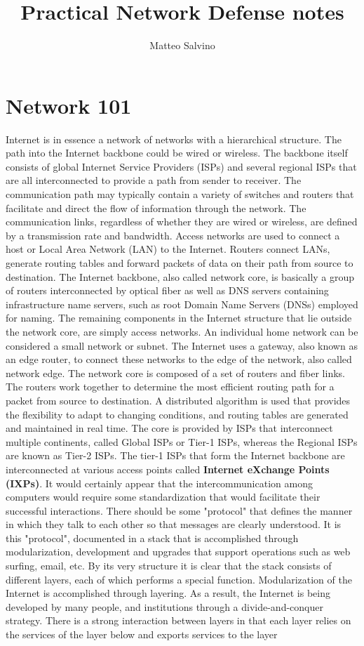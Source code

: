 \documentclass[11pt]{article}
\title{Practical Network Defense notes}
\author{Matteo Salvino}
\date{}
\begin{document}
\maketitle
\pagebreak
\tableofcontents
\pagebreak
\section{Network 101}
Internet is in essence a network of networks with a hierarchical structure. The path into the Internet backbone could be wired or wireless. The backbone itself consists of global Internet Service Providers (ISPs) and several regional ISPs that are all interconnected to provide a path from sender to receiver. The communication path may typically contain a variety of switches and routers that facilitate and direct the flow of information through the network. The communication links, regardless of whether they are wired or wireless, are defined by a transmission rate and bandwidth. Access networks are used to connect a host or Local Area Network (LAN) to the Internet. Routers connect  LANs, generate routing tables and forward  packets of data on their path from source to destination. The Internet backbone, also called network core, is basically a group of routers interconnected by optical fiber as well as DNS servers containing infrastructure name servers, such as root Domain Name Servers (DNSs) employed for naming. The remaining components in the Internet structure that lie outside the network core, are simply access networks. An individual home network can be considered a small network or subnet. The Internet uses a gateway, also known as an edge router, to connect these networks to the edge of the network, also called network edge. The network core is composed of a set of routers and fiber links. The routers work together to determine the most efficient routing path for a packet from source to destination. A distributed algorithm is used that provides the flexibility to adapt to changing conditions, and routing tables are generated and maintained in real time. The core is provided by ISPs that interconnect multiple continents, called Global ISPs or Tier-1 ISPs, whereas the Regional ISPs are known as Tier-2 ISPs. The tier-1 ISPs that form the Internet backbone are interconnected at various access points called \textbf{Internet eXchange Points (IXPs)}. It would certainly appear that the intercommunication among computers would require some standardization that would facilitate their successful interactions. There should be some "protocol" that defines the manner in which they talk to each other so that messages are clearly understood. It is this "protocol", documented in a stack that is accomplished through modularization, development and upgrades that support operations such as web surfing, email, etc. By its very structure it is clear that the stack consists of different layers, each  of which performs a special function. Modularization of the Internet is accomplished through layering. As a result, the Internet is being developed by many people, and institutions through a divide-and-conquer strategy. There is a strong interaction between layers in that each layer relies on the services of the layer below and exports services to the layer 
\end{document}
